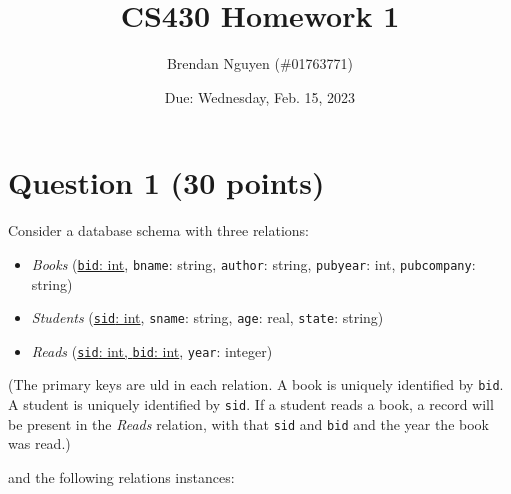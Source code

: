 \documentclass[letterpaper, 11pt]{article}
\title{CS430 Homework 1}
\author{Brendan Nguyen (\#01763771)}
\date{Due: Wednesday, Feb. 15, 2023}
\begin{document}
\maketitle

\section*{Question 1 (30 points)}

Consider a database schema with three relations:
\begin{itemize}
    \item \textit{Books} (\ul{\texttt{bid}: int}, \texttt{bname}: string, \texttt{author}: string, \texttt{pubyear}: int, \texttt{pubcompany}: string)
    \item \textit{Students} (\ul{\texttt{sid}: int}, \texttt{sname}: string, \texttt{age}: real, \texttt{state}: string)
    \item \textit{Reads} (\ul{\texttt{sid}: int, \texttt{bid}: int}, \texttt{year}: integer)
\end{itemize}

(The primary keys are uld in each relation. A book is uniquely identified by \texttt{bid}. A student is uniquely identified by \texttt{sid}. If a student reads a book, a record will be present in the \textit{Reads} relation, with that \texttt{sid} and \texttt{bid} and the year the book was read.)

and the following relations instances:
\end{document}
